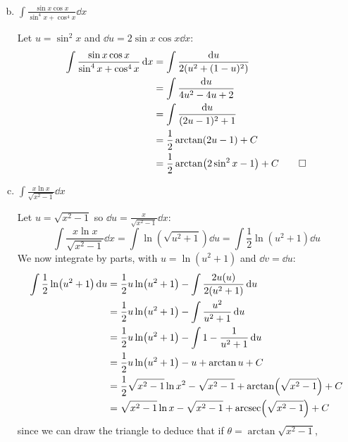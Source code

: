 \documentclass{agony}
\begin{document}
\begin{enumerate}[(a)]
\begin{sol}
\begin{align*}
          \end{align*}
        \end{sol}
  \item $\displaystyle\int \frac{\sin x \cos x}{\sin^4 x + \cos^4 x} \dd{x}$
        \begin{sol}
          Let $u = \sin^2 x$ and $\dd{u} = 2\sin x\cos x \dd{x}$:
          \begin{align*}
            \int \frac{\sin x \cos x}{\sin^4 x + \cos^4 x} \dd{x}
             & = \int \frac{\dd u}{2(u^2 + (1-u)^2)}        \\
             & = \int \frac{\dd u}{4u^2 - 4u + 2}           \\
             & = \int \frac{\dd u}{(2u - 1)^2 + 1}          \\
             & = \frac12\arctan(2u-1) + C                   \\
             & = \frac12\arctan(2\sin^2 x - 1) + C \qedhere
          \end{align*}
        \end{sol}
  \item $\displaystyle\int \frac{x \ln x}{\sqrt{x^2 - 1}} \dd{x}$
        \begin{sol}
          Let $u = \sqrt{x^2 - 1}$ so $\dd{u} = \frac{x}{\sqrt{x^2-1}}\dd{x}$:
          \begin{equation*}
            \int \frac{x \ln x}{\sqrt{x^2 - 1}} \dd{x}
            = \int \ln(\sqrt{u^2+1}) \dd{u}
            = \int \frac12\ln(u^2+1) \dd{u}
          \end{equation*}
          We now integrate by parts, with $u = \ln(u^2+1)$ and $\dd{v} = \dd{u}$:
          \begin{align*}
            \int \frac12\ln(u^2+1) \dd{u}
             & = \frac12 u\ln(u^2+1) - \int \frac{2u(u)}{2(u^2 + 1)} \dd{u}             \\
             & = \frac12 u\ln(u^2+1) - \int \frac{u^2}{u^2 + 1} \dd{u}                  \\
             & = \frac12 u\ln(u^2+1) - \int 1 - \frac{1}{u^2 + 1} \dd{u}                \\
             & = \frac12 u\ln(u^2+1) - u + \arctan u + C                                \\
             & = \frac12 \sqrt{x^2-1}\ln x^2 - \sqrt{x^2-1} + \arctan(\sqrt{x^2-1}) + C \\
             & = \sqrt{x^2-1}\ln x - \sqrt{x^2-1} + \arcsec(\sqrt{x^2-1}) + C
          \end{align*}
          since we can draw the triangle to deduce that if $\theta = \arctan\sqrt{x^2-1}$,

\end{sol}
\end{enumerate}
\end{document}
